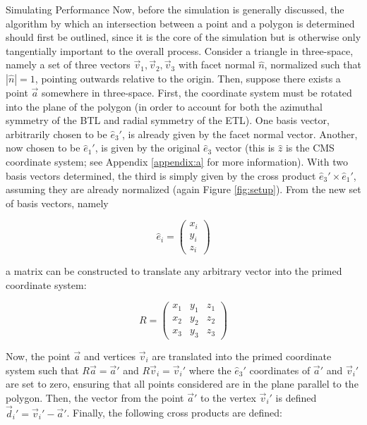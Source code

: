 \documentclass[oneside,12pt,final]{sty/ucthesis-CA2012}
\begin{document}
\begin{mainmatter}
\begin{section}{Simulating Performance}
Now, before the simulation is generally discussed, the algorithm by which an intersection between a point and a polygon is determined should first be outlined, since it is the core of the simulation but is otherwise only tangentially important to the overall process. Consider a triangle in three-space, namely a set of three vectors $\vec{v}_1, \vec{v}_2, \vec{v}_3$ with facet normal $\hat{n}$, normalized such that $|\hat{n}| = 1$, pointing outwards relative to the origin. Then, suppose there exists a point $\vec{a}$ somewhere in three-space. First, the coordinate system must be rotated into the plane of the polygon (in order to account for both the azimuthal symmetry of the BTL and radial symmetry of the ETL). One basis vector, arbitrarily chosen to be $\hat{e}_3'$, is already given by the facet normal vector. Another, now chosen to be $\hat{e}_{1}'$, is given by the original $\hat{e}_3$ vector (this is $\hat{z}$ is the CMS coordinate system; see Appendix \ref{appendix:a} for more information). With two basis vectors determined, the third is simply given by the cross product $\hat{e}_3'\times\hat{e}_1'$, assuming they are already normalized (again Figure \ref{fig:setup}). From the new set of basis vectors, namely

\begin{equation}
    \hat{e}_i = \begin{pmatrix} x_i \\ y_i \\ z_i \end{pmatrix}
\end{equation}

\noindent a matrix can be constructed to translate any arbitrary vector into the primed coordinate system:

\begin{equation}
    R = \begin{pmatrix} 
        x_1 & y_1 & z_1 \\
        x_2 & y_2 & z_2 \\
        x_3 & y_3 & z_3
    \end{pmatrix}
\end{equation}

\noindent Now, the point $\vec{a}$ and vertices $\vec{v}_i$ are translated into the primed coordinate system such that $R\vec{a} = \vec{a}'$ and $R\vec{v}_i = \vec{v}_{i}'$ where the $\hat{e}_3'$ coordinates of $\vec{a}'$ and $\vec{v}_i'$ are set to zero, ensuring that all points considered are in the plane parallel to the polygon. Then, the vector from the point $\vec{a}'$ to the vertex $\vec{v}_{i}'$ is defined $\vec{d}_{i}' = \vec{v}_{i}'-\vec{a}'$. Finally, the following cross products are defined:


\end{section}
\end{mainmatter}
\end{document}
